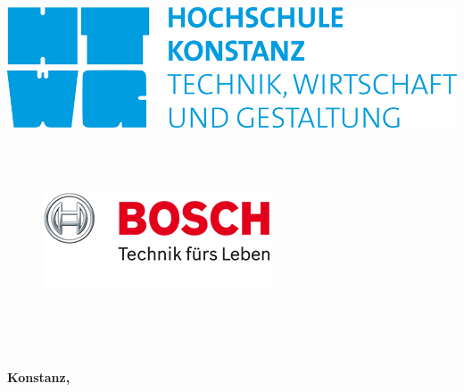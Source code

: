 \begin{titlepage}

\vspace*{-3.5cm}

\begin{flushleft}
\hspace*{-1cm} \includegraphics{media/logos/HTWG.jpg}
\end{flushleft}

\vspace{1cm}

\begin{center}
	\large{
		\textbf{\strLecture} \\[2cm]
	}
	\Huge{
		\textbf{\strTopic} \\[2cm]
	}
\end{center}
\begin{figure}[!htpb]
	\centering
	\includegraphics[scale=1.5]{media/logos/Bosch.png}
\end{figure}
\begin{center}
	\Large{
		\textbf{\strAuthorOne} \\
		\textbf{\strAuthorTwo}} \\[3cm]
	\large{
		\textbf{} \\[2.3cm]
	}
	
	\large{
		\textbf{Konstanz, \strDate}
	}
\end{center}

\end{titlepage}
\thispagestyle{empty}